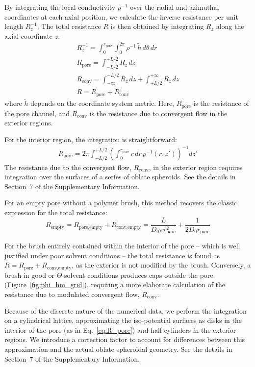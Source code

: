 \documentclass[12pt, a4paper]{article}
\begin{document}
By integrating the local conductivity $\rho^{-1}$ over the radial and azimuthal coordinates at each axial position, we calculate the inverse resistance per unit length $R_z^{-1}$.
The total resistance $R$ is then obtained by integrating $R_z$ along the axial coordinate $z$:
\begin{eqnarray}
    R_z^{-1} = \int_{0}^{r_{\text{pore}}}\int_{0}^{2\pi}\rho^{-1} \, \tilde{h} \, d\theta \, dr\\
    R_{\text{pore}} = \int_{-L/2}^{+L/2} R_z \, dz\\
    R_{\text{conv}} = \int_{-\infty}^{-L/2} R_z \, dz + \int_{+L/2}^{+\infty} R_z \, dz\\
    R = R_{\text{pore}} + R_{\text{conv}}
\end{eqnarray}
where $\tilde{h}$ depends on the coordinate system metric. Here, $R_{\textrm{pore}}$ is the resistance of the pore channel, and $R_{\textrm{conv}}$ is the resistance due to convergent flow in the exterior regions.

For the interior region, the integration is straightforward:
\begin{eqnarray}
    R_{\text{pore}} = 2\pi\int_{-L/2}^{+L/2}\left(\int_{0}^{r_{\text{pore}}} r \, dr \, \rho^{-1}(r, z')\right)^{-1} dz'
    \label{eq:R_pore}
\end{eqnarray}
The resistance due to the convergent flow, $R_{\text{conv}}$, in the exterior region requires integration over the surfaces of a series of oblate spheroids. 
See the details in Section~7 of the Supplementary Information.

For an empty pore without a polymer brush, this method recovers the classic expression for the total resistance:
\begin{equation} 
    R_{\textrm{empty}} = R_{\textrm{pore,empty}} + R_{\textrm{conv,empty}} = \frac{L}{D_0 \pi r_{\textrm{pore}}^2} + \frac{1}{2 D_0 r_{\textrm{pore}}}
\end{equation}

For the brush entirely contained within the interior of the pore -- which is well justified under poor solvent conditions -- the total resistance is found as $R = R_{\textrm{pore}} + R_{\textrm{conv,empty}}$, as the exterior is not modified by the brush.
Conversely, a brush in good or $\Theta$-solvent conditions produces caps outside the pore (Figure~\ref{fig:phi_hm_grid}), requiring a more elaborate calculation of the resistance due to modulated convergent flow, $R_{\textrm{conv}}$.

Because of the discrete nature of the numerical data, we perform the integration on a cylindrical lattice, approximating the iso-potential surfaces as disks in the interior of the pore (as in Eq.~\ref{eq:R_pore}) and half-cylinders in the exterior regions.
We introduce a correction factor to account for differences between this approximation and the actual oblate spheroidal geometry.
See the details in Section~7 of the Supplementary Information.
\end{document}
